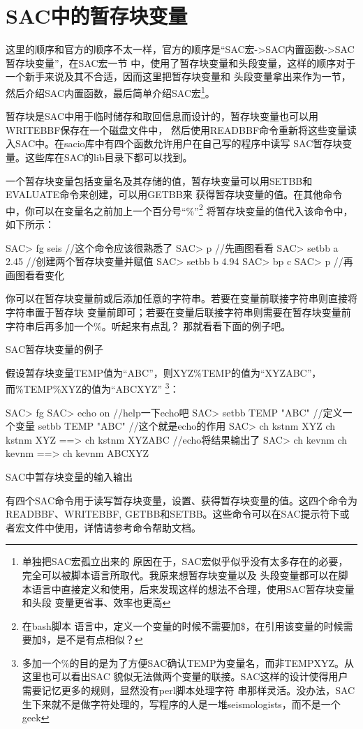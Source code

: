 \section{SAC中的暂存块变量}
这里的顺序和官方的顺序不太一样，官方的顺序是``SAC宏->SAC内置函数->SAC暂存块变量''，在SAC宏一节
中，使用了暂存块变量和头段变量，这样的顺序对于一个新手来说及其不合适，因而这里把暂存块变量和
头段变量拿出来作为一节，然后介绍SAC内置函数，最后简单介绍SAC宏\footnote{单独把SAC宏孤立出来的
原因在于，SAC宏似乎似乎没有太多存在的必要，完全可以被脚本语言所取代。我原来想暂存块变量以及
头段变量都可以在脚本语言中直接定义和使用，后来发现这样的想法不合理，使用SAC暂存块变量和头段
变量更省事、效率也更高}。

暂存块是SAC中用于临时储存和取回信息而设计的，暂存块变量也可以用WRITEBBF保存在一个磁盘文件中，
然后使用READBBF命令重新将这些变量读入SAC中。在sacio库中有四个函数允许用户在自己写的程序中读写
SAC暂存块变量。这些库在SAC的lib目录下都可以找到。

一个暂存块变量包括变量名及其存储的值，暂存块变量可以用SETBB和EVALUATE命令来创建，可以用GETBB来
获得暂存块变量的值。在其他命令中，你可以在变量名之前加上一个百分号``\%''\footnote{在bash脚本
语言中，定义一个变量的时候不需要加\$，在引用该变量的时候需要加\$，是不是有点相似？}
将暂存块变量的值代入该命令中，如下所示：
\begin{SACCode}
SAC> fg seis         //这个命令应该很熟悉了
SAC> p               //先画图看看
SAC> setbb a 2.45    //创建两个暂存块变量并赋值
SAC> setbb b 4.94
SAC> bp c %
SAC> p               //再画图看看变化
\end{SACCode}

你可以在暂存块变量前或后添加任意的字符串。若要在变量前联接字符串则直接将字符串置于暂存块
变量前即可；若要在变量后联接字符串则需要在暂存块变量前字符串后再多加一个\%。听起来有点乱？
那就看看下面的例子吧。

SAC暂存块变量的例子

假设暂存块变量TEMP值为``ABC''，则XYZ\%TEMP的值为``XYZABC''，而\%TEMP\%XYZ的值为``ABCXYZ''
\footnote{多加一个\%的目的是为了方便SAC确认TEMP为变量名，而非TEMPXYZ。从这里也可以看出SAC
貌似无法做两个变量的联接。SAC这样的设计使得用户需要记忆更多的规则，显然没有perl脚本处理字符
串那样灵活。没办法，SAC生下来就不是做字符处理的，写程序的人是一堆seismologists，而不是一个geek}：
\begin{SACCode}
SAC> fg 
SAC> echo on           //help一下echo吧
SAC> setbb TEMP "ABC"  //定义一个变量
 setbb TEMP "ABC"      //这个就是echo的作用
SAC> ch kstnm XYZ%
 ch kstnm XYZ%
 ==> ch kstnm XYZABC   //echo将结果输出了
SAC> ch kevnm %
 ch kevnm %
 ==> ch kevnm ABCXYZ
\end{SACCode}

SAC中暂存块变量的输入输出

有四个SAC命令用于读写暂存块变量，设置、获得暂存块变量的值。这四个命令为READBBF、WRITEBBF,
GETBB和SETBB。这些命令可以在SAC提示符下或者宏文件中使用，详情请参考命令帮助文档。

